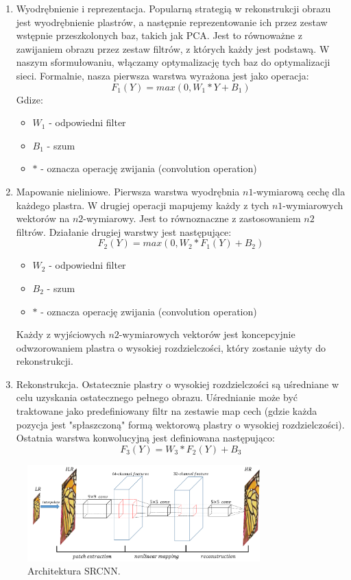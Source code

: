 \documentclass[a4paper,11pt, notitlepage ]{article}
\begin{document}
	 \begin{enumerate}
	 	\item Wyodrębnienie i reprezentacja. Popularną strategią w rekonstrukcji obrazu  jest wyodrębnienie plastrów, a następnie reprezentowanie ich przez zestaw wstępnie przeszkolonych baz, takich jak PCA. Jest to równoważne z zawijaniem obrazu przez zestaw filtrów, z których każdy jest podstawą. W naszym sformułowaniu, włączamy optymalizację tych baz do optymalizacji sieci. Formalnie, nasza pierwsza warstwa wyrażona jest jako operacja:
	 	$$ F_1(Y)=max(0,W_1 * Y+ B_1)$$
	 	Gdize: 
	 	\begin{itemize}
	 		\item$W_1$ - odpowiedni filter
	 		\item $B_1$ - szum
	 		\item $*$ - oznacza operację zwijania (convolution operation) 
	 	\end{itemize}
	 	\item Mapowanie nieliniowe. Pierwsza warstwa wyodrębnia $n1$-wymiarową cechę dla każdego plastra. W drugiej operacji mapujemy każdy z tych $n1$-wymiarowych wektorów na $n2$-wymiarowy. Jest to równoznaczne z zastosowaniem $n2$ filtrów. Działanie drugiej warstwy jest następujące:
	 	$$F_2(Y)= max(0,W_2*F_1(Y)+B_2)$$
	 	\begin{itemize}
	 		\item$W_2$ - odpowiedni filter
	 		\item $B_2$ - szum
	 		\item $*$ - oznacza operację zwijania (convolution operation) 
	 	\end{itemize}
 		Każdy z wyjściowych $n2$-wymiarowych vektorów jest koncepcyjnie odwzorowaniem plastra o wysokiej rozdzielczości, który zostanie użyty do rekonstrukcji.
	 	\item Rekonstrukcja. Ostatecznie  plastry o wysokiej rozdzielczości są  uśredniane w celu uzyskania ostatecznego pełnego obrazu.  Uśrednianie może być traktowane jako predefiniowany filtr na zestawie map cech (gdzie każda pozycja jest "spłaszczoną" formą wektorową plastry o wysokiej rozdzielczości). Ostatnia warstwa konwolucyjną jest definiowana następująco:
	 	$$F_3(Y)=W_3*F_2(Y)+B_3$$
	 \end{enumerate}
 	\begin{figure}[h!]
 	\centering
 	\includegraphics[width=0.8\textwidth]{SRCNN.png}
 	\caption{Architektura SRCNN.}
 	\end{figure}
 
\end{document}
